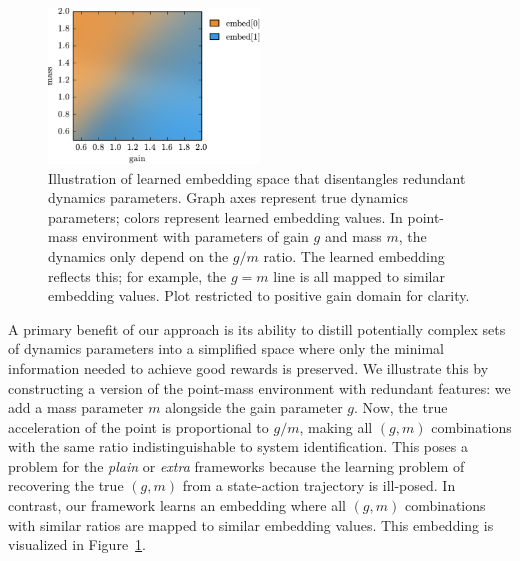 \documentclass{article}
\newcommand{\TODO}[1]{\textcolor{red}{\textbf{TODO: #1}}}
\newcommand{\plain}{\emph{plain}}
\newcommand{\extra}{\emph{extra}}
\begin{document}
\begin{figure}
\centering
\includegraphics[width=0.5\textwidth]{embed_colors.pdf}
\caption{
Illustration of learned embedding space that disentangles redundant dynamics parameters.
Graph axes represent true dynamics parameters; colors represent learned embedding values.
In point-mass environment with parameters of gain $g$ and mass $m$,
the dynamics only depend on the $g/m$ ratio.
The learned embedding reflects this; for example, the $g=m$ line is all mapped to similar embedding values.
Plot restricted to positive gain domain for clarity.
}
\label{fig:embed_colors}
\end{figure}
A primary benefit of our approach is its ability to distill potentially complex sets of dynamics parameters
into a simplified space where only the minimal information needed to achieve good rewards is preserved.
We illustrate this by constructing a version of the point-mass environment with redundant features:
we add a mass parameter $m$ alongside the gain parameter $g$.
Now, the true acceleration of the point is proportional to $g/m$,
making all $(g, m)$ combinations with the same ratio indistinguishable to system identification.
This poses a problem for the \plain{} or \extra{} frameworks
because the learning problem of recovering the true $(g, m)$ from a state-action trajectory is ill-posed.
In contrast, our framework learns an embedding where all $(g, m)$ combinations with similar ratios are mapped to similar embedding values.
This embedding is visualized in Figure~\ref{fig:embed_colors}.

\end{document}
